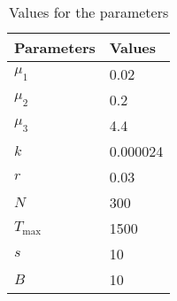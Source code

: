 \begin{table}
	\centering
	\begin{tabular}{ll}
		\toprule
			\textbf{Parameters} & \textbf{Values}
            \\
        \midrule
            $\mu_1$ & 0.02
            \\
        	$\mu_2$ & 0.2
			\\
            $\mu_3$ & 4.4
            \\
     	    $k$ & 0.000024
 			\\
     	    $r$ & 0.03
     	    \\
     	    $N$ & 300
            \\
     	    $T_{\text{max}}$ & 1500
     	    \\
     	    $s$ & 10
			\\
     	    $B$ & 10
     	    \\
		\bottomrule
    \end{tabular}
	\caption{Values for the parameters}
\end{table}
